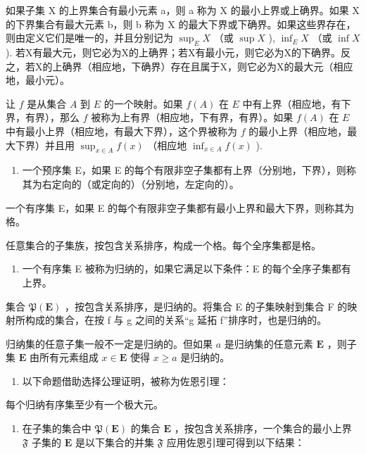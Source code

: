 如果子集 X 的上界集合有最小元素 a，则 a 称为 X 的最小上界或上确界。如果 X 的下界集合有最大元素 b，则 b 称为 X 的最大下界或下确界。如果这些界存在，则由定义它们是唯一的，并且分别记为 \(\sup_{E} X\) （或 \(\sup X\) ), \(\inf_{E} X\) （或 \(\inf X\) ). 若X有最大元，则它必为X的上确界；若X有最小元，则它必为X的下确界。反之，若X的上确界（相应地，下确界）存在且属于X，则它必为X的最大元（相应地，最小元）。

让 \(f\) 是从集合 \(A\) 到 \(E\) 的一个映射。如果 \(f(A)\) 在 \(E\) 中有上界（相应地，有下界，有界），那么 \(f\) 被称为上有界（相应地，下有界，有界）。如果 \(f(A)\) 在 \(E\) 中有最小上界（相应地，有最大下界），这个界被称为 \(f\) 的最小上界（相应地，最大下界）并且用 \(\sup_{x \in A} f(x)\) （相应地 \(\inf_{x \in A} f(x)\) ).

\begin{enumerate}
\def\labelenumi{\arabic{enumi}.}
\setcounter{enumi}{7}
\tightlist
\item
  一个预序集 E，如果 E 的每个有限非空子集都有上界（分别地，下界），则称其为右定向的（或定向的）（分别地，左定向的）。
\end{enumerate}

一个有序集 E，如果 E 的每个有限非空子集都有最小上界和最大下界，则称其为格。

任意集合的子集族，按包含关系排序，构成一个格。每个全序集都是格。

\begin{enumerate}
\def\labelenumi{\arabic{enumi}.}
\setcounter{enumi}{8}
\tightlist
\item
  一个有序集 E 被称为归纳的，如果它满足以下条件：E 的每个全序子集都有上界。
\end{enumerate}

集合 \(\mathfrak{P}(\mathbf{E})\) ，按包含关系排序，是归纳的。将集合 E 的子集映射到集合 F 的映射所构成的集合，在按 f 与 g 之间的关系“g 延拓 f”排序时，也是归纳的。

归纳集的任意子集一般不一定是归纳的。但如果 \(a\) 是归纳集的任意元素 \(\mathbf{E}\) ，则子集 \(\mathbf{E}\) 由所有元素组成 \(x \in \mathbf{E}\) 使得 \(x \geqslant a\) 是归纳的。

\begin{enumerate}
\def\labelenumi{\arabic{enumi}.}
\setcounter{enumi}{9}
\tightlist
\item
  以下命题借助选择公理证明，被称为佐恩引理：
\end{enumerate}

每个归纳有序集至少有一个极大元。

\begin{enumerate}
\def\labelenumi{\arabic{enumi}.}
\setcounter{enumi}{10}
\tightlist
\item
  在子集的集合中 \(\mathfrak{P}(\mathbf{E})\) 的集合 \(\mathbf{E}\) ，按包含关系排序，一个集合的最小上界 \(\mathfrak{F}\) 子集的 \(\mathbf{E}\) 是以下集合的并集 \(\mathfrak{F}\) 应用佐恩引理可得到以下结果：
\end{enumerate}


